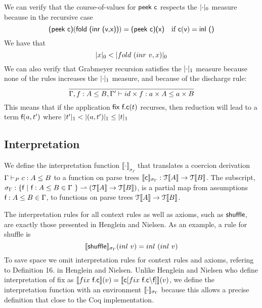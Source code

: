 \documentclass[a4paper,UKenglish,cleveref, autoref, thm-restate]{lipics-v2021}
\begin{document}
We can verify that the course-of-values for $\textsf{peek c}$ respects the $\zerom{\cdot}$ measure because in the recursive case \[\textsf{(peek c)}(\textsf{fold (inr (v,x))})=\textsf{(peek c)(x)}\quad \text{if }\textsf{c}(\textsf{v})=\textsf{inl ()}\]
We have that 
\[ \zerom{x} < \zerom{fold~ (inr~ v,x)}\]
We can also verify that Grabmeyer recursion satisfies the $\onem{\cdot}$ measure because none of the rules increases the $\onem{\cdot}$ measure, and because of the discharge rule:
\[\infer{\contains{\Gamma, f : A \leq B, \Gamma'}{id \times f}{a \times A}{a \times B}}{}\]
This means that if the application $\textsf{fix f.c}(t)$ recurses, then reduction will lead to a term $\textsf{f}(a,t')$ where $\onem{t'} < \onem{(a,t')}\leq \onem{t}$\\
\subsection{Interpretation}
We define the interpretation function $\llbracket \cdot \rrbracket_{\sigma_{\Gamma}}$ that translates a coercion derivation $\containsG{c}{A}{B}$ to a function on parse trees $\llbracket \textsf{c} \rrbracket_{\sigma_{\Gamma}} : \mathcal{T}\llbracket A \rrbracket  \rightarrow \mathcal{T}\llbracket B \rrbracket$. The subscript, $\sigma_{\Gamma} : \{ \textsf{f} ~|~\textsf{f} : A \leq B  \in \Gamma \ \} \rightharpoonup  (\mathcal{T}\llbracket A \rrbracket \rightarrow \mathcal{T}\llbracket B \rrbracket)$, is a partial map from assumptions $\textsf{f} : A \leq B  \in \Gamma$, to functions on parse trees $\mathcal{T}\llbracket A \rrbracket \rightarrow \mathcal{T}\llbracket B \rrbracket$. 

The interpretation rules for all context rules as well as axioms, such as $\textsf{shuffle}$, are exactly those presented in Henglein and Nielsen. As an example, a rule for shuffle is 
\[\interpsig{shuffle}{inl~v}{inl~(inl~v)} \]
To save space we omit interpretation rules for context rules and axioms, refering to Definition 16. in Henglein and Nielsen. Unlike Henglein and Nielsen who define interpretation of fix as $\interp{\fix ~ \dslcom{f.c}}(\mathsf{v})=\interp{\dslcom{c}[\fix~\dslcom{f.c} \backslash \dslcom{f}]}(\mathsf{v})$, we define the interpretation function with an environment $\llbracket \cdot \rrbracket_{\sigma_{\Gamma}}$ because this allows a precise definition that close to the Coq implementation.
\end{document}
